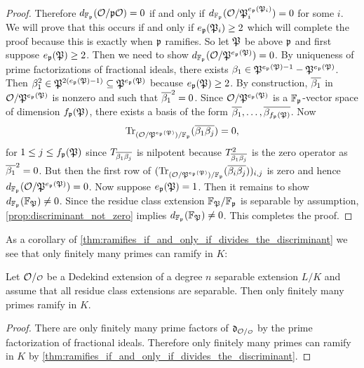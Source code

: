 \begin{proof}
      Therefore $d_{\mathbb{F}_{\mathfrak{p}}}(\mathcal{O}/\mathfrak{p}\mathcal{O}) = 0$ if and only if $d_{\mathbb{F}_{\mathfrak{p}}}(\mathcal{O}/\mathfrak{P}_{i}^{e_{\mathfrak{p}}(\mathfrak{P}_{i})}) = 0$ for some $i$. We will prove that this occurs if and only if $e_{\mathfrak{p}}(\mathfrak{P}_{i}) \ge 2$ which will complete the proof because this is exactly when $\mathfrak{p}$ ramifies. So let $\mathfrak{P}$ be above $\mathfrak{p}$ and first suppose $e_{\mathfrak{p}}(\mathfrak{P}) \ge 2$. Then we need to show $d_{\mathbb{F}_{\mathfrak{p}}}(\mathcal{O}/\mathfrak{P}^{e_{\mathfrak{p}}(\mathfrak{P})}) = 0$. By uniqueness of prime factorizations of fractional ideals, there exists $\beta_{1} \in \mathfrak{P}^{e_{\mathfrak{p}}(\mathfrak{P})-1}-\mathfrak{P}^{e_{\mathfrak{p}}(\mathfrak{P})}$. Then $\beta_{1}^{2} \in \mathfrak{P}^{2(e_{\mathfrak{p}}(\mathfrak{P})-1)} \subseteq \mathfrak{P}^{e_{\mathfrak{p}}(\mathfrak{P})}$ because $e_{\mathfrak{p}}(\mathfrak{P}) \ge 2$. By construction, $\overline{\beta_{1}}$ in $\mathcal{O}/\mathfrak{P}^{e_{\mathfrak{p}}(\mathfrak{P})}$ is nonzero and such that $\overline{\beta_{1}}^{2} = 0$. Since $\mathcal{O}/\mathfrak{P}^{e_{\mathfrak{p}}(\mathfrak{P})}$ is a $\mathbb{F}_{\mathfrak{p}}$-vector space of dimension $f_{\mathfrak{p}}(\mathfrak{P})$, there exists a basis of the form $\overline{\beta_{1}},\ldots,\overline{\beta_{f_{\mathfrak{p}}(\mathfrak{P})}}$. Now
      \[
        \operatorname{\mathrm{Tr}}_{(\mathcal{O}/\mathfrak{P}^{e_{\mathfrak{p}}(\mathfrak{P})})/\mathbb{F}_{\mathfrak{p}}}(\overline{\beta_{1}\beta_{j}}) = 0,
      \]
      for $1 \le j \le f_{\mathfrak{p}}(\mathfrak{P})$ since $T_{\overline{\beta_{1}}\overline{\beta_{j}}}$ is nilpotent because $T_{\overline{\beta_{1}}\overline{\beta_{j}}}^{2}$ is the zero operator as $\overline{\beta_{1}}^{2} = 0$. But then the first row of $(\operatorname{\mathrm{Tr}}_{(\mathcal{O}/\mathfrak{P}^{e_{\mathfrak{p}}(\mathfrak{P})})/\mathbb{F}_{\mathfrak{p}}}(\overline{\beta_{i}\beta_{j}}))_{i,j}$ is zero and hence $d_{\mathbb{F}_{\mathfrak{p}}}(\mathcal{O}/\mathfrak{P}^{e_{\mathfrak{p}}(\mathfrak{P})}) = 0$. Now suppose $e_{\mathfrak{p}}(\mathfrak{P}) = 1$. Then it remains to show $d_{\mathbb{F}_{\mathfrak{p}}}(\mathbb{F}_{\mathfrak{P}}) \neq 0$. Since the residue class extension $\mathbb{F}_{\mathfrak{P}}/\mathbb{F}_{\mathfrak{p}}$ is separable by assumption, \cref{prop:discriminant_not_zero} implies $d_{\mathbb{F}_{\mathfrak{p}}}(\mathbb{F}_{\mathfrak{P}}) \neq 0$. This completes the proof.
    \end{proof}

    As a corollary of \cref{thm:ramifies_if_and_only_if_divides_the_discriminant} we see that only finitely many primes can ramify in $K$:

    \begin{corollary}\label{cor:finitely_many_primes_ramify_K}
      Let $\mc{O}/\smc{O}$ be a Dedekind extension of a degree $n$ separable extension $L/K$ and assume that all residue class extensions are separable. Then only finitely many primes ramify in $K$.
    \end{corollary}
    \begin{proof}
      There are only finitely many prime factors of $\mf{d}_{\mc{O}/\smc{O}}$ by the prime factorization of fractional ideals. Therefore only finitely many primes can ramify in $K$ by \cref{thm:ramifies_if_and_only_if_divides_the_discriminant}.
    \end{proof}

